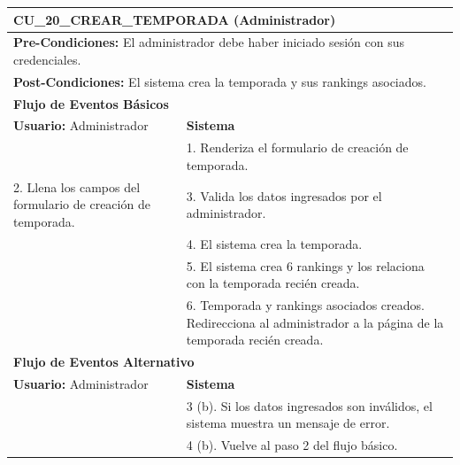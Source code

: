 
\begin{center}
  \begin{tabular}{| p{7.5cm} | p{7.5cm} |}
    \hline
    \multicolumn{2}{|p{15cm}|}{\textbf{CU\_20\_CREAR\_TEMPORADA} (Administrador)} \\ \hline
    \multicolumn{2}{|p{15cm}|}{\textbf{Pre-Condiciones:} El administrador debe haber iniciado sesión con sus credenciales.} \\ \hline
    \multicolumn{2}{|p{15cm}|}{\textbf{Post-Condiciones:} El sistema crea la temporada y sus rankings asociados.} \\ \hline
    \multicolumn{2}{|p{7.5cm}|}{\textbf{Flujo de Eventos Básicos}} \\ \hline
    \multicolumn{1}{|p{7.5cm}|}{\textbf{Usuario:} Administrador} & \multicolumn{1}{|p{7.5cm}|}{\textbf{Sistema}} \\ \hline
    
    \multicolumn{1}{|p{7.5cm}|}{} & 
    \multicolumn{1}{|p{7.5cm}|}{1. Renderiza el formulario de creación de temporada.}\\ \hline
    
    \multicolumn{1}{|p{7.5cm}|}{2. Llena los campos del formulario de creación de temporada.}& 
    \multicolumn{1}{|p{7.5cm}|}{3. Valida los datos ingresados por el administrador.}\\ \hline
    
    \multicolumn{1}{|p{7.5cm}|}{} & 
    \multicolumn{1}{|p{7.5cm}|}{4. El sistema crea la temporada.}\\ \hline
    
    \multicolumn{1}{|p{7.5cm}|}{} & 
    \multicolumn{1}{|p{7.5cm}|}{5. El sistema crea 6 rankings y los relaciona con la temporada recién creada.}\\ \hline
    
    \multicolumn{1}{|p{7.5cm}|}{} & 
    \multicolumn{1}{|p{7.5cm}|}{6. Temporada y rankings asociados creados. Redirecciona al administrador a la página de la temporada recién creada.}\\ \hline
    
    \multicolumn{2}{|p{7.5cm}|}{\textbf{Flujo de Eventos Alternativo}} \\ \hline
    
    \multicolumn{1}{|p{7.5cm}|}{\textbf{Usuario:} Administrador} & \multicolumn{1}{|p{7.5cm}|}{\textbf{Sistema}} \\ \hline
    
    \multicolumn{1}{|p{7.5cm}|}{} & 
    \multicolumn{1}{|p{7.5cm}|}{3 (b). Si los datos ingresados son inválidos, el sistema muestra un mensaje de error.}\\ \hline
    
    \multicolumn{1}{|p{7.5cm}|}{} & 
    \multicolumn{1}{|p{7.5cm}|}{4 (b). Vuelve al paso 2 del flujo básico.}\\ \hline
  \end{tabular}
  
  \label{table:usecase:20}
\end{center}

